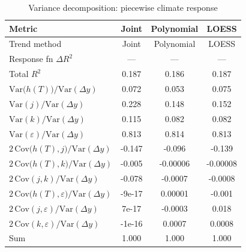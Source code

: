 \begin{table}[htbp]
\centering
\caption{Variance decomposition: piecewise climate response}
\label{tab:variance_decomp_piecewise}

\small
\begin{tabular}{@{}lccc@{}}
\toprule
Metric & Joint & Polynomial & LOESS \\
\midrule
Trend method & Joint & Polynomial & LOESS \\
\midrule
Response fn $\Delta R^2$ & — & — & — \\
Total $R^2$ & 0.187 & 0.186 & 0.187 \\
\midrule
$\mathrm{Var}\!\big(h(T)\big)/\mathrm{Var}(\Delta y)$ & 0.072 & 0.053 & 0.075 \\
$\mathrm{Var}(j)/\mathrm{Var}(\Delta y)$ & 0.228 & 0.148 & 0.152 \\
$\mathrm{Var}(k)/\mathrm{Var}(\Delta y)$ & 0.115 & 0.082 & 0.082 \\
$\mathrm{Var}(\varepsilon)/\mathrm{Var}(\Delta y)$ & 0.813 & 0.814 & 0.813 \\
\midrule
$2\,\mathrm{Cov}\!\big(h(T),j\big)/\mathrm{Var}(\Delta y)$ & -0.147 & -0.096 & -0.139 \\
$2\,\mathrm{Cov}\!\big(h(T),k\big)/\mathrm{Var}(\Delta y)$ & -0.005 & -0.00006 & -0.00008 \\
$2\,\mathrm{Cov}(j,k)/\mathrm{Var}(\Delta y)$ & -0.078 & -0.0007 & -0.0008 \\
$2\,\mathrm{Cov}\!\big(h(T),\varepsilon\big)/\mathrm{Var}(\Delta y)$ & -9e-17 & 0.00001 & -0.001 \\
$2\,\mathrm{Cov}(j,\varepsilon)/\mathrm{Var}(\Delta y)$ & 7e-17 & -0.0003 & 0.018 \\
$2\,\mathrm{Cov}(k,\varepsilon)/\mathrm{Var}(\Delta y)$ & -1e-16 & 0.0007 & 0.0008 \\
\midrule
Sum & 1.000 & 1.000 & 1.000 \\
\bottomrule
\end{tabular}
\end{table}
